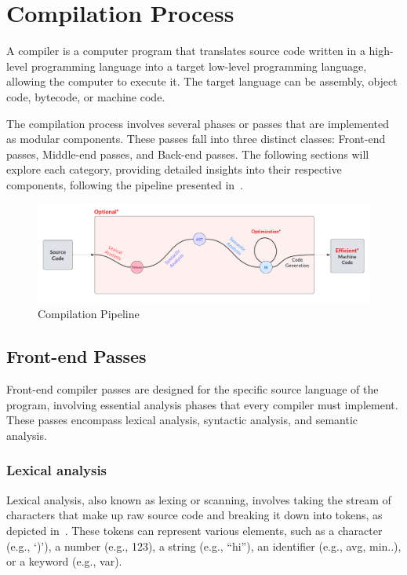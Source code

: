 \section{Compilation Process}\label{sec:aco:general}

        A compiler is a computer program that translates source code written in a high-level programming language into a target low-level programming language, allowing the computer to execute it. The target language can be assembly, object code, bytecode, or machine code.

        The compilation process involves several phases or passes that are implemented as modular components. These passes fall into three distinct classes: Front-end passes, Middle-end passes, and Back-end passes. The following sections will explore each category, providing detailed insights into their respective components, following the pipeline presented in~.

        \begin{figure}[hbt!]
                \begin{center}
                \includegraphics[width=.9\textwidth]{assets/images/compil.png}
                \end{center}
                \caption{Compilation Pipeline}%
                \label{fig:aco:general:compil}
            \end{figure}

    

    \subsection{Front-end Passes}
        Front-end compiler passes are designed for the specific source language of the program, involving essential analysis phases that every compiler must implement. These passes encompass lexical analysis, syntactic analysis, and semantic analysis. 

        \subsubsection{Lexical analysis}
            Lexical analysis, also known as lexing or scanning, involves taking the stream of characters that make up raw source code and breaking it down into tokens, as depicted in~. These tokens can represent various elements, such as a character (e.g., ‘)’), a number (e.g., 123), a string (e.g., “hi”), an identifier (e.g., avg, min..), or a keyword (e.g., var).

